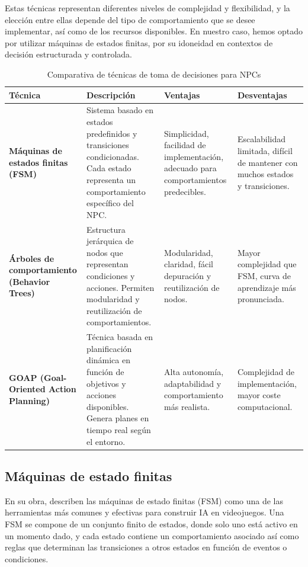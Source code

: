 Estas técnicas representan diferentes niveles de complejidad y flexibilidad, y la elección entre ellas depende del tipo de comportamiento que se desee implementar, así como de los recursos disponibles. En nuestro caso, hemos optado por utilizar máquinas de estados finitas, por su idoneidad en contextos de decisión estructurada y controlada.



\begin{table}[htbp]
\centering
\caption{Comparativa de técnicas de toma de decisiones para NPCs}
\begin{tabularx}{\textwidth}{|X|X|X|X|}
\hline
\textbf{Técnica} & \textbf{Descripción} & \textbf{Ventajas} & \textbf{Desventajas} \\
\hline
\textbf{Máquinas de estados finitas (FSM)} & Sistema basado en estados predefinidos y transiciones condicionadas. Cada estado representa un comportamiento específico del NPC. & Simplicidad, facilidad de implementación, adecuado para comportamientos predecibles. & Escalabilidad limitada, difícil de mantener con muchos estados y transiciones. \\
\hline
\textbf{Árboles de comportamiento (Behavior Trees)} & Estructura jerárquica de nodos que representan condiciones y acciones. Permiten modularidad y reutilización de comportamientos. & Modularidad, claridad, fácil depuración y reutilización de nodos. & Mayor complejidad que FSM, curva de aprendizaje más pronunciada. \\
\hline
\textbf{GOAP (Goal-Oriented Action Planning)} & Técnica basada en planificación dinámica en función de objetivos y acciones disponibles. Genera planes en tiempo real según el entorno. & Alta autonomía, adaptabilidad y comportamiento más realista. & Complejidad de implementación, mayor coste computacional. \\
\hline
\end{tabularx}
\label{tab:ComparativaTecnicas_NPCs}
\end{table}

\subsection{Máquinas de estado finitas}
En su obra, \cite{MillingtonFunge2016} describen las máquinas de estado finitas (FSM) como una de las herramientas más comunes y efectivas para construir IA en videojuegos. Una FSM se compone de un conjunto finito de estados, donde solo uno está activo en un momento dado, y cada estado contiene un comportamiento asociado así como reglas que determinan las transiciones a otros estados en función de eventos o condiciones.\\

